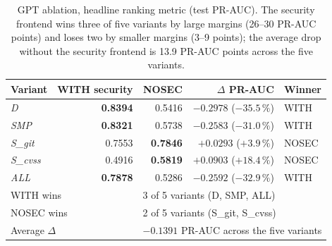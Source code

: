 \documentclass[11pt,a4paper]{article}
\begin{document}
\begin{table}[!htbp]
\centering\small
\begin{tabular}{lrrrl}
\toprule
Variant & WITH security & NOSEC & $\Delta$ PR-AUC & Winner \\
\midrule
\emph{D}       & \textbf{0.8394} & 0.5416          & $-0.2978$ ($-35.5\,\%$) & WITH  \\
\emph{SMP}     & \textbf{0.8321} & 0.5738          & $-0.2583$ ($-31.0\,\%$) & WITH  \\
\emph{S\_git}  & 0.7553          & \textbf{0.7846} & $+0.0293$ ($+3.9\,\%$)  & NOSEC \\
\emph{S\_cvss} & 0.4916          & \textbf{0.5819} & $+0.0903$ ($+18.4\,\%$) & NOSEC \\
\emph{ALL}     & \textbf{0.7878} & 0.5286          & $-0.2592$ ($-32.9\,\%$) & WITH  \\
\midrule
\multicolumn{2}{l}{WITH wins} & \multicolumn{3}{l}{3 of 5 variants (D, SMP, ALL)} \\
\multicolumn{2}{l}{NOSEC wins} & \multicolumn{3}{l}{2 of 5 variants (S\_git, S\_cvss)} \\
\multicolumn{2}{l}{Average $\Delta$} & \multicolumn{3}{l}{$-0.1391$ PR-AUC across the five variants} \\
\bottomrule
\end{tabular}
\caption{GPT ablation, headline ranking metric (test
PR-AUC). The security frontend wins three of five variants
by large margins (26--30 PR-AUC points) and loses two by
smaller margins (3--9 points); the average drop without
the security frontend is 13.9 PR-AUC points across the
five variants.}
\label{tab:gpt-headline}
\end{table}
\end{document}
